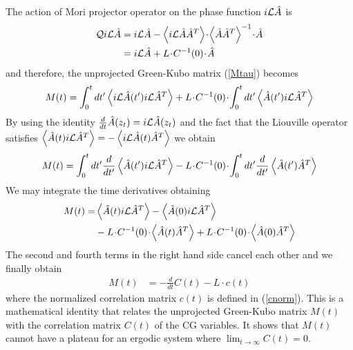 \documentclass[b5paper,openright,10pt]{book}
\newcommand{\esc}{\!\cdot\!}
\newcommand{\llangle}{\left\langle}
\newcommand{\rrangle}{\right\rangle}
\begin{document}
The action  of Mori projector  operator on the phase  function $i{\cal
  L}\hat{A}$ is
\begin{align}
{\cal Q} i{\cal L}\hat{A} &= i{\cal L}\hat{A}-\llangle i{\cal L}\hat{A} \hat{A}^T\rrangle\esc \llangle\hat{A}\hat{A}^T\rrangle^{-1}\esc \hat{A}
\nonumber\\
&=
i{\cal L}\hat{A}+L\esc C^{-1}(0)\esc \hat{A}  
\label{QiLA}
\end{align}
and therefore, the unprojected Green-Kubo matrix (\ref{Mtau}) becomes
\begin{align}
M(t)=
  \int_0^{t} dt' \llangle i{\cal L}\hat{A}(t') i{\cal L}\hat{A}^T\rrangle
+
L\esc C^{-1}(0)\esc   \int_0^{t} dt' \llangle \hat{A}(t') i{\cal L}\hat{A}^T\rrangle
\end{align}
By using the identity $\frac{d}{dt}\hat{A}(z_t)=i{\cal L}\hat{A}(z_t)$
and the  fact that  the Liouville  operator satisfies  $
\llangle   \hat{A}(t)   i{\cal  L}\hat{A}^T\rrangle=-\llangle   i{\cal
  L}\hat{A}(t) \hat{A}^T\rrangle$ we obtain
\begin{align}
M(t)=
  \int_0^{t} dt' \frac{d}{dt'}\llangle \hat{A}(t') i{\cal L}\hat{A}^T\rrangle
-
L\esc C^{-1}(0)\esc   \int_0^{t} dt' \frac{d}{dt'}\llangle \hat{A}(t') \hat{A}^T\rrangle
\end{align}
We may integrate the time derivatives obtaining
  \begin{align}
    M(t)=&\llangle \hat{A}(t) i{\cal L}\hat{A}^T\rrangle-\llangle \hat{A}(0) i{\cal L}\hat{A}^T\rrangle
    \nonumber \\
    &-L\esc C^{-1}(0)\esc   \llangle \hat{A}(t) \hat{A}^T\rrangle
+L\esc C^{-1}(0)\esc   \llangle \hat{A}(0) \hat{A}^T\rrangle
\end{align}
The second and  fourth terms in the right hand  side cancel each other
and we finally obtain
\begin{align}
M(t)&=-\frac{d}{dt}C(t)-L\esc c(t)
\label{Math1}
\end{align}
where the normalized correlation matrix $c(t)$ is defined in (\ref{cnorm}).
This is a mathematical identity that  relates 
  the unprojected Green-Kubo matrix $M(t)$ with the correlation matrix $C(t)$ of the CG variables. It shows
that $M(t)$ cannot have a plateau for an ergodic system where $\lim_{t\to\infty}C(t)= 0$. 
\end{document}
